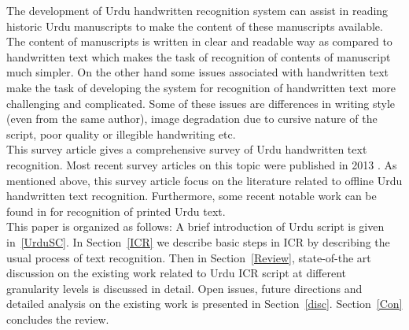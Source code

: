 \documentclass[a4paper,conference]{IEEEtran}
\begin{document}
The development of Urdu handwritten recognition system can assist in reading historic Urdu manuscripts to make the content of these manuscripts available. The content of manuscripts is written in clear and readable way as compared to handwritten text which makes the task of recognition of contents of manuscript much simpler. On the other hand some issues associated with handwritten text make the task of developing the system for recognition of handwritten text more challenging and complicated. Some of these issues are differences in writing style (even from the same author), image degradation due to cursive nature of the script, poor quality or illegible handwriting etc.\\
This survey article gives a comprehensive survey of Urdu handwritten text recognition. Most recent survey articles on this topic were published in 2013 \cite{7, 66, 71}. As mentioned above, this survey article focus on the literature related to offline Urdu handwritten text recognition. Furthermore, some recent notable work can be found in \cite{67, 68, 69, 70} for recognition of printed Urdu text.\\
This paper is organized as follows: A brief introduction of Urdu script is given in~\ref{UrduSC}. In Section~\ref{ICR} we describe basic steps in ICR by describing the usual process of text recognition. Then in Section~\ref{Review}, state-of-the art discussion on the existing work related to Urdu ICR script at different granularity levels is discussed in detail. Open issues, future directions and detailed analysis on the existing work is presented in Section~\ref{disc}. Section~\ref{Con} concludes the review.
\end{document}
